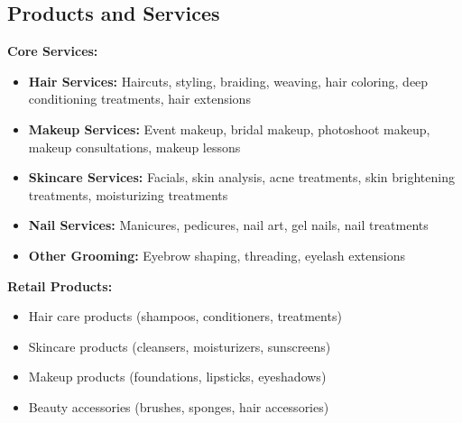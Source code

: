 \subsection{Products and Services}

\textbf{Core Services:}
\begin{itemize}[leftmargin=2em]
    \item \textbf{Hair Services:} Haircuts, styling, braiding, weaving, hair coloring, deep conditioning treatments, hair extensions
    \item \textbf{Makeup Services:} Event makeup, bridal makeup, photoshoot makeup, makeup consultations, makeup lessons
    \item \textbf{Skincare Services:} Facials, skin analysis, acne treatments, skin brightening treatments, moisturizing treatments
    \item \textbf{Nail Services:} Manicures, pedicures, nail art, gel nails, nail treatments
    \item \textbf{Other Grooming:} Eyebrow shaping, threading, eyelash extensions
\end{itemize}

\textbf{Retail Products:}
\begin{itemize}[leftmargin=2em]
    \item Hair care products (shampoos, conditioners, treatments)
    \item Skincare products (cleansers, moisturizers, sunscreens)
    \item Makeup products (foundations, lipsticks, eyeshadows)
    \item Beauty accessories (brushes, sponges, hair accessories)
\end{itemize}

